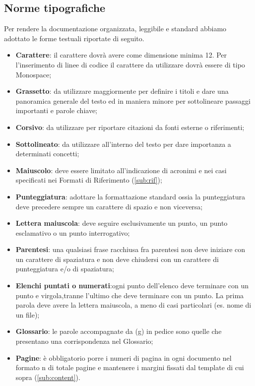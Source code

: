{		\subsection{Norme tipografiche}{
			\label{sub:typo}
			Per rendere la documentazione organizzata, leggibile e standard abbiamo adottato le forme testuali riportate di seguito.
			\begin{itemize}
				\item \textbf{Carattere}: il carattere dovr\`{a} avere come dimensione minima 12. Per l'inserimento di linee di codice il carattere da utilizzare dovr\`{a} essere di tipo Monospace;
				\item \textbf{Grassetto}: da utilizzare maggiormente per definire i titoli e dare una panoramica generale del testo ed in maniera minore per sottolineare passaggi importanti e parole chiave;
				\item \textbf{Corsivo}: da utilizzare per riportare citazioni da fonti esterne o riferimenti;
				\item \textbf{Sottolineato}: da utilizzare all'interno del testo per dare importanza a determinati concetti;
				\item \textbf{Maiuscolo}: deve essere limitato all’indicazione di acronimi e nei casi specificati nei Formati di Riferimento (\ref{sub:rif});
				\item \textbf{Punteggiatura}: adottare la formattazione standard ossia la punteggiatura deve precedere sempre un carattere di spazio e non viceversa;
				\item \textbf{Lettera maiuscola}: deve seguire esclusivamente un punto, un punto esclamativo o un punto interrogativo;
				\item \textbf{Parentesi}: una qualsiasi frase racchiusa fra parentesi non deve iniziare con un carattere di spaziatura e non deve chiudersi con un carattere di punteggiatura e/o di spaziatura;
				\item \textbf{Elenchi puntati o numerati}:ogni punto dell’elenco deve terminare con un punto e virgola,tranne l’ultimo che deve terminare con un punto. La prima parola deve avere la lettera maiuscola, a meno di casi particolari (es. nome di un file);
				\item \textbf{Glossario}: le parole accompagnate da (g) in pedice sono quelle che presentano una corrispondenza nel Glossario;
				\item \textbf{Pagine}: \`{e} obbligatorio porre i numeri di pagina in ogni documento nel formato {n} di {totale pagine} e mantenere i margini fissati dal template di cui sopra (\ref{sub:content}).
			\end{itemize}
		}
}
